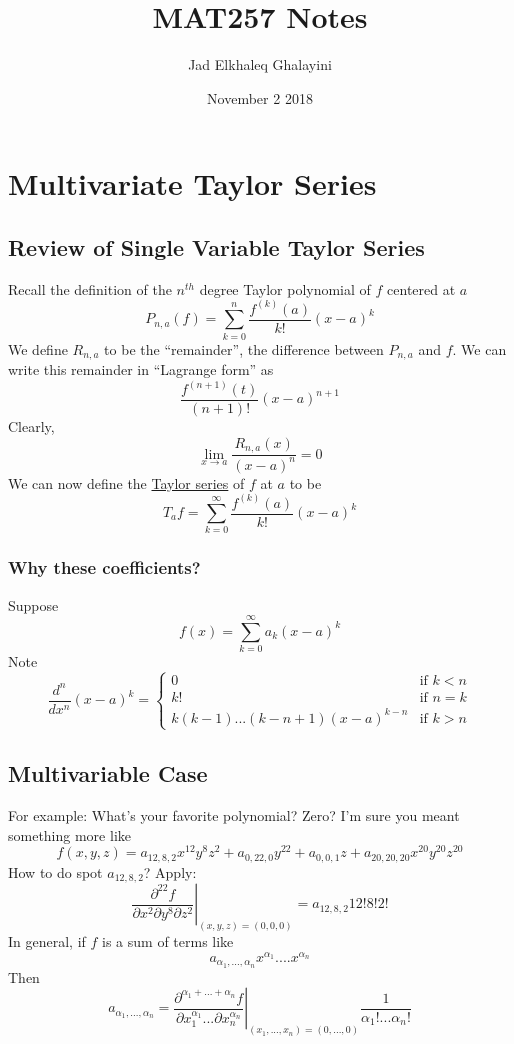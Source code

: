 \documentclass{article}
\title{MAT257 Notes}
\author{Jad Elkhaleq Ghalayini}
\date{November 2 2018}
\begin{document}
\maketitle

\section{Multivariate Taylor Series}

\subsection{Review of Single Variable Taylor Series}
Recall the definition of the \(n^{th}\) degree Taylor polynomial of \(f\) centered at \(a\)
\[P_{n, a}(f) = \sum_{k = 0}^n\frac{f^{(k)}(a)}{k!}(x - a)^k\]
We define \(R_{n, a}\) to be the ``remainder'', the difference between \(P_{n, a}\) and \(f\). We can write this remainder in ``Lagrange form'' as
\[\frac{f^{(n + 1)}(t)}{(n + 1)!}(x - a)^{n + 1}\]
Clearly,
\[\lim_{x \to a}\frac{R_{n, a}(x)}{(x - a)^n} = 0\]
We can now define the \underline{Taylor series} of \(f\) at \(a\) to be
\[T_af = \sum_{k = 0}^\infty\frac{f^{(k)}(a)}{k!}(x - a)^k\]
\subsubsection{Why these coefficients?}
Suppose
\[f(x) = \sum_{k = 0}^\infty a_k(x - a)^k\]
Note
\[\frac{d^n}{dx^n}(x - a)^k = \left\{\begin{array}{cc}
  0 & \text{if } k < n \\
  k! & \text{if } n = k \\
  k(k - 1)...(k - n + 1)(x - a)^{k - n} & \text{if } k > n
\end{array}\right.\]

\subsection{Multivariable Case}
For example: What's your favorite polynomial? Zero? I'm sure you meant something more like
\[f(x, y, z) = a_{12,8,2}x^{12}y^8z^2 + a_{0,22,0}y^{22} + a_{0,0,1}z + a_{20,20,20}x^{20}y^{20}z^{20}\]
How to do spot \(a_{12, 8, 2}\)? Apply:
\[\left.\frac{\partial^{22}f}{\partial x^2 \partial y^8 \partial z^2}\right|_{(x, y, z) = (0, 0, 0)} = a_{12, 8, 2}12!8!2!\]
In general, if \(f\) is a sum of terms like
\[a_{\alpha_1,...,\alpha_n}x^{\alpha_1}....x^{\alpha_n}\]
Then
\[a_{\alpha_1,...,\alpha_n} = \left.\frac{\partial^{\alpha_1 + ... + \alpha_n}f}{\partial x_1^{\alpha_1} ... \partial x_n^{\alpha_n}}\right|_{(x_1,...,x_n) = (0,...,0)}\frac{1}{\alpha_1!...\alpha_n!}\]
\end{document}
